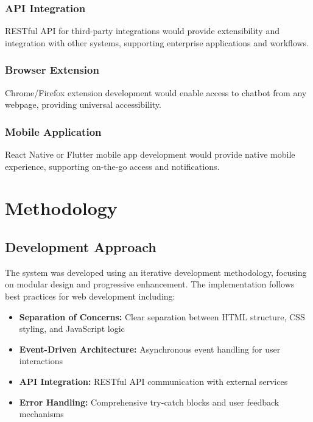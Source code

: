\documentclass[conference]{IEEEtran}
\begin{document}
\subsubsection{API Integration}
RESTful API for third-party integrations would provide extensibility and integration with other systems, supporting enterprise applications and workflows.

\subsubsection{Browser Extension}
Chrome/Firefox extension development would enable access to chatbot from any webpage, providing universal accessibility.

\subsubsection{Mobile Application}
React Native or Flutter mobile app development would provide native mobile experience, supporting on-the-go access and notifications.

\section{Methodology}

\subsection{Development Approach}
The system was developed using an iterative development methodology, focusing on modular design and progressive enhancement. The implementation follows best practices for web development including:
\begin{itemize}[itemsep=0pt, parsep=0pt, leftmargin=*]
    \item \textbf{Separation of Concerns:} Clear separation between HTML structure, CSS styling, and JavaScript logic
    \item \textbf{Event-Driven Architecture:} Asynchronous event handling for user interactions
    \item \textbf{API Integration:} RESTful API communication with external services
    \item \textbf{Error Handling:} Comprehensive try-catch blocks and user feedback mechanisms
\end{itemize}
\end{document}
